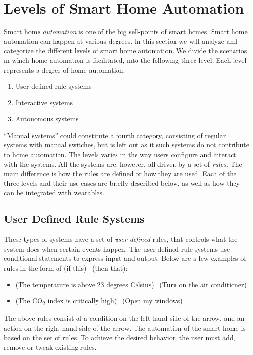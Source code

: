 \section{Levels of Smart Home Automation}\label{sec:system-categories}
Smart home \emph{automation} is one of the big sell-points of smart homes.
Smart home automation can happen at various degrees. 
In this section we will analyze and categorize the different levels of smart home automation. 
We divide the scenarios in which home automation is facilitated, 
into the following three level. Each level represents a degree of home automation.

\begin{enumerate}
    \item User defined rule systems
    \item Interactive systems
    \item Autonomous systems
\end{enumerate}

``Manual systems'' could constitute a fourth category, 
consisting of regular systems with manual switches,
but is left out as it such systems do not contribute to home automation.
The levels varies in the way users configure and interact with the systems. 
All the systems are, however, all driven by a set of \emph{rules}. 
The main difference is how the rules are defined or how they are used.
Each of the three levels and their use cases are briefly described below,
as well as how they can be integrated with wearables.

\subsection{User Defined Rule Systems}

These types of systems have a set of \emph{user defined} rules, 
that controls what the system does when certain events happen. 
The user defined rule systems use conditional statements to express input and output. 
Below are a few examples of rules in the form of (if this) \textrightarrow~(then that):

\begin{itemize}
    \item (The temperature is above 23 degrees Celsius) \textrightarrow~(Turn on the air conditioner)
    \item (The CO\textsubscript{2} index is critically high) \textrightarrow~(Open my windows)
\end{itemize}

The above rules consist of a condition on the left-hand side of the arrow, 
and an action on the right-hand side of the arrow.
The automation of the smart home is based on the set of rules. 
To achieve the desired behavior, the user must add, remove or tweak existing rules.

